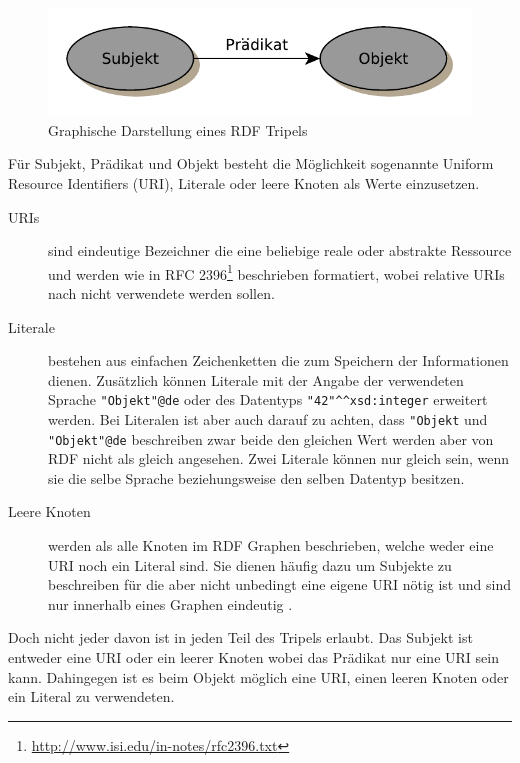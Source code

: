 \begin{figure}[h]
    \centering
    \includegraphics[scale=0.7]{assets/images/rdf-triple}
    \caption{Graphische Darstellung eines RDF Tripels}
    \label{fig:graphische_darstellung_eines_rdf_tripels}
\end{figure} 

Für Subjekt, Prädikat und Objekt besteht die Möglichkeit sogenannte Uniform Resource Identifiers (URI), Literale oder leere Knoten als Werte einzusetzen. 

\begin{description}
    \item[URIs] sind eindeutige Bezeichner die eine beliebige reale oder abstrakte Ressource und werden wie in RFC 2396\footnote{\url{http://www.isi.edu/in-notes/rfc2396.txt}} beschrieben formatiert, wobei relative URIs nach \cite{Klyne2004} nicht verwendete werden sollen.
    \item[Literale] bestehen aus einfachen Zeichenketten die zum Speichern der Informationen dienen. Zusätzlich können Literale mit der Angabe der verwendeten Sprache \lstinline[basicstyle=\ttfamily]{"Objekt"@de} oder des Datentyps \lstinline[basicstyle=\ttfamily]{"42"^^xsd:integer} erweitert werden. Bei Literalen ist aber auch darauf zu achten, dass \lstinline[basicstyle=\ttfamily]{"Objekt} und \lstinline[basicstyle=\ttfamily]{"Objekt"@de} beschreiben zwar beide den gleichen Wert werden aber von RDF nicht als gleich angesehen. Zwei Literale können nur gleich sein, wenn sie die selbe Sprache beziehungsweise den selben Datentyp besitzen.  
    \item[Leere Knoten] werden als alle Knoten im RDF Graphen beschrieben, welche weder eine URI noch ein Literal sind. Sie dienen häufig dazu um Subjekte zu beschreiben für die aber nicht unbedingt eine eigene URI nötig ist und sind nur innerhalb eines Graphen eindeutig .
\end{description}

Doch nicht jeder davon ist in jeden Teil des Tripels erlaubt. Das Subjekt ist entweder eine URI oder ein leerer Knoten wobei das Prädikat nur eine URI sein kann. Dahingegen ist es beim Objekt möglich eine URI, einen leeren Knoten oder ein Literal zu verwendeten. 

